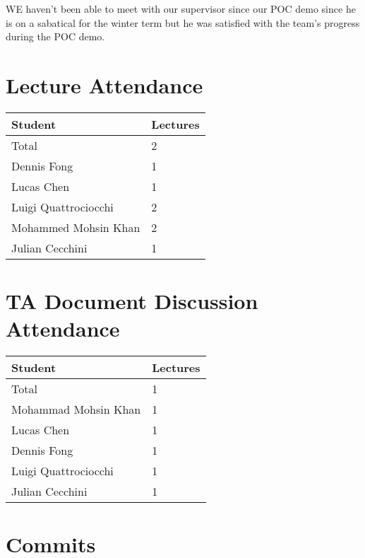 \documentclass{article}
\begin{document}
WE haven't been able to meet with our supervisor since our POC demo since he is on a sabatical for the winter term but he was satisfied with the team's progress during the POC demo.

\section{Lecture Attendance}

\begin{table}[H]
\centering
\begin{tabular}{ll}
\toprule
\textbf{Student} & \textbf{Lectures}\\
\midrule
Total & 2\\
Dennis Fong & 1\\
Lucas Chen & 1\\
Luigi Quattrociocchi & 2\\
Mohammed Mohsin Khan & 2\\
Julian Cecchini & 1\\
\bottomrule
\end{tabular}
\end{table}

\section{TA Document Discussion Attendance}

\begin{table}[H]
\centering
\begin{tabular}{ll}
\toprule
\textbf{Student} & \textbf{Lectures}\\
\midrule
Total & 1\\
Mohammad Mohsin Khan & 1\\
Lucas Chen & 1\\
Dennis Fong & 1\\
Luigi Quattrociocchi & 1\\
Julian Cecchini & 1\\
\bottomrule
\end{tabular}
\end{table}

\section{Commits}

\end{document}
